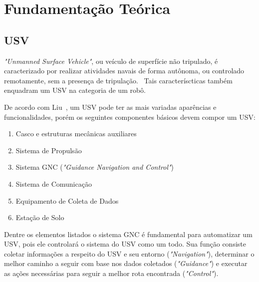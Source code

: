 \chapter{Fundamentação Teórica}\label{chap2:fund_teo}
    \section{USV}\label{subchap2:USV}
        \textit{"Unmanned Surface Vehicle"}, ou veículo de superfície não tripulado, é caracterizado por realizar atividades navais de forma autônoma, ou controlado remotamente, sem a presença de tripulação.~\cite{LIU201671} Tais caracteríscticas também enquadram um USV na categoria de um robô.~\cite{JURAK2020}
        
        De acordo com Liu~\cite{LIU201671}, um USV pode ter as mais variadas aparências e funcionalidades, porém os seguintes componentes básicos devem compor um USV:
        
        \begin{enumerate}
            \item Casco e estruturas mecânicas auxiliares
            \item Sistema de Propulsão
            \item Sistema GNC (\textit{"Guidance Navigation and Control"})
            \item Sistema de Comunicação
            \item Equipamento de Coleta de Dados
            \item Estação de Solo
        \end{enumerate}
        
        Dentre os elementos listados o sistema GNC é fundamental para automatizar um USV, pois ele controlará o sistema do USV como um todo. Sua função consiste coletar informações a respeito do USV e seu entorno (\textit{"Navigation"}), determinar o melhor caminho a seguir com base nos dados coletados (\textit{"Guidance"}) e executar as ações necessárias para seguir a melhor rota encontrada (\textit{"Control"}).  ~\cite{LIU201671} ~\cite{JURAK2020}
        
